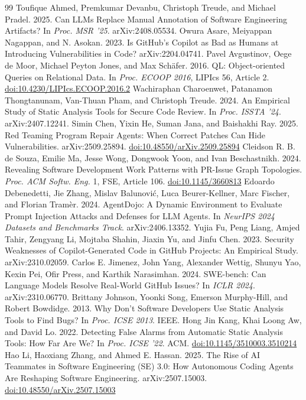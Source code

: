 \documentclass[acmsmall,screen,nonacm]{acmart}
\providecommand{\doi}[1]{\href{https://doi.org/#1}{doi:#1}}
\begin{document}
\begingroup\small
\begin{thebibliography}{99}
 Toufique Ahmed, Premkumar Devanbu, Christoph Treude, and Michael Pradel. 2025. Can LLMs Replace Manual Annotation of Software Engineering Artifacts? In \emph{Proc. MSR '25}. arXiv:2408.05534.
 Owura Asare, Meiyappan Nagappan, and N. Asokan. 2023. Is GitHub's Copilot as Bad as Humans at Introducing Vulnerabilities in Code? arXiv:2204.04741.
 Pavel Avgustinov, Oege de Moor, Michael Peyton Jones, and Max Sch\"afer. 2016. QL: Object-oriented Queries on Relational Data. In \emph{Proc. ECOOP 2016}, LIPIcs 56, Article 2. \doi{10.4230/LIPIcs.ECOOP.2016.2}
 Wachiraphan Charoenwet, Patanamon Thongtanunam, Van-Thuan Pham, and Christoph Treude. 2024. An Empirical Study of Static Analysis Tools for Secure Code Review. In \emph{Proc. ISSTA '24}. arXiv:2407.12241.
 Simin Chen, Yixin He, Suman Jana, and Baishakhi Ray. 2025. Red Teaming Program Repair Agents: When Correct Patches Can Hide Vulnerabilities. arXiv:2509.25894. \doi{10.48550/arXiv.2509.25894}
 Cleidson R. B. de Souza, Emilie Ma, Jesse Wong, Dongwook Yoon, and Ivan Beschastnikh. 2024. Revealing Software Development Work Patterns with PR-Issue Graph Topologies. \emph{Proc. ACM Softw. Eng.} 1, FSE, Article 106. \doi{10.1145/3660813}
 Edoardo Debenedetti, Jie Zhang, Mislav Balunovi\'c, Luca Beurer-Kellner, Marc Fischer, and Florian Tram\`er. 2024. AgentDojo: A Dynamic Environment to Evaluate Prompt Injection Attacks and Defenses for LLM Agents. In \emph{NeurIPS 2024 Datasets and Benchmarks Track}. arXiv:2406.13352.
 Yujia Fu, Peng Liang, Amjed Tahir, Zengyang Li, Mojtaba Shahin, Jiaxin Yu, and Jinfu Chen. 2023. Security Weaknesses of Copilot-Generated Code in GitHub Projects: An Empirical Study. arXiv:2310.02059.
 Carlos E. Jimenez, John Yang, Alexander Wettig, Shunyu Yao, Kexin Pei, Ofir Press, and Karthik Narasimhan. 2024. SWE-bench: Can Language Models Resolve Real-World GitHub Issues? In \emph{ICLR 2024}. arXiv:2310.06770.
 Brittany Johnson, Yoonki Song, Emerson Murphy-Hill, and Robert Bowdidge. 2013. Why Don't Software Developers Use Static Analysis Tools to Find Bugs? In \emph{Proc. ICSE 2013}. IEEE.
 Hong Jin Kang, Khai Loong Aw, and David Lo. 2022. Detecting False Alarms from Automatic Static Analysis Tools: How Far Are We? In \emph{Proc. ICSE '22}. ACM. \doi{10.1145/3510003.3510214}
 Hao Li, Haoxiang Zhang, and Ahmed E. Hassan. 2025. The Rise of AI Teammates in Software Engineering (SE) 3.0: How Autonomous Coding Agents Are Reshaping Software Engineering. arXiv:2507.15003. \doi{10.48550/arXiv.2507.15003}

\end{thebibliography}
\end{document}
